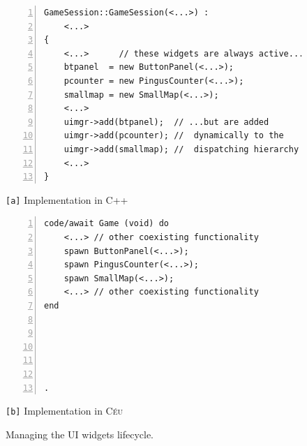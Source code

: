 \documentclass{vgtc}                          %
\newcommand{\CEU}{\textsc{C\'{e}u}\xspace}
\newcommand{\code}[1] {{\small{\texttt{#1}}}}
\newcommand{\ax}{\code{[a]}\xspace}
\newcommand{\bx}{\code{[b]}\xspace}
\begin{document}
\begin{figure}[t]
\begin{minipage}[t]{0.54\linewidth}
\begin{lstlisting}[numbers=left,xleftmargin=3em]
GameSession::GameSession(<...>) :
    <...>
{
    <...>      // these widgets are always active...
    btpanel  = new ButtonPanel(<...>);
    pcounter = new PingusCounter(<...>);
    smallmap = new SmallMap(<...>);
    <...>
    uimgr->add(btpanel);  // ...but are added
    uimgr->add(pcounter); //  dynamically to the
    uimgr->add(smallmap); //  dispatching hierarchy
    <...>
}
\end{lstlisting}
\centering\small{\ax Implementation in C++}
\end{minipage}
%
\begin{minipage}[t]{0.46\linewidth}
\begin{lstlisting}[numbers=left,xleftmargin=3em]
code/await Game (void) do
    <...> // other coexisting functionality
    spawn ButtonPanel(<...>);
    spawn PingusCounter(<...>);
    spawn SmallMap(<...>);
    <...> // other coexisting functionality
end





.
\end{lstlisting}
\centering\small{\bx Implementation in \CEU}
\end{minipage}
\caption{ Managing the UI widgets lifecycle.
\label{lst.ui}
}
\end{figure}
\end{document}
